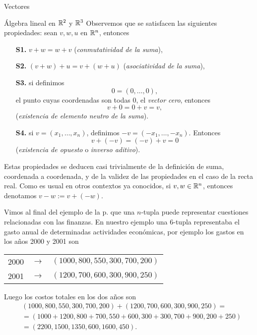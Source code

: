 \begin{chapter}{Vectores}
\begin{section}{\'Algebra lineal en $\mathbb R^2$ y $\mathbb R^3$}
        Observemos que se satisfacen las siguientes propiedades: sean $v,w,u$ en $\mathbb R^n$,  entonces
        \begin{enumerate}
        \item[\textbf{S1.}] $v + w = w + v$ (\textit{conmutatividad de la suma}),
        \item[\textbf{S2.}] $(v+ w)+ u = v + (w+u)$ (\textit{asociatividad de la suma}),
        \item[\textbf{S3.}] si definimos
        \begin{equation*}
        0 = (0,\dots,0),
        \end{equation*}
        el punto cuyas coordenadas son todas $0$, el \textit{vector cero}, entonces 
            \begin{equation*}
        v +0 = 0 +v = v,
        \end{equation*}
         (\textit{existencia de elemento neutro de la suma}).
        \item[\textbf{S4.}]si $v = (x_1,\ldots,x_n)$,  definimos $-v = (-x_1,\ldots, -x_n)$. Entonces 
        \begin{equation*}
        v + (-v) = (-v) + v = 0
        \end{equation*} 
        (\textit{existencia de opuesto} o  \textit{inverso aditivo}).
    \end{enumerate}

    Estas propiedades se deducen casi trivialmente de la definición de suma, coordenada a coordenada, y de la validez de las propiedades en el caso de la recta real. Como es usual en otros contextos ya conocidos, si $v,w \in \mathbb R^n$,  entonces denotamos $v- w := v + (-w)$.
    
    
    
    
   
    \begin{ejemplo*} 
        Vimos al final del ejemplo de la p. \pageref{ej-3espacio-industria} que una $n$-tupla puede representar cuestiones relacionadas con las finanzas. En  nuestro ejemplo una 6-tupla representaba el gasto anual de determinadas actividades económicas, por ejemplo los gastos  en los años 2000 y 2001 son 
        \begin{center}
            \begin{tabular}{lcl}
                2000 \quad&$\rightarrow$\quad &$(1000, 800, 550, 300, 700, 200)$ \\
                2001 \quad&$\rightarrow$\quad &$(1200, 700, 600, 300, 900, 250)$ 
            \end{tabular} 
        \end{center}
        Luego los costos totales en los dos años son 
        \begin{align*}
            &(1000, 800, 550, 300, 700, 200) + (1200, 700, 600, 300, 900, 250) = \\
            &=(1000+1200, 800+700, 550+600, 300+300, 700+900, 200+250) \\
            &= (2200, 1500, 1350, 600, 1600, 450). 
        \end{align*} 
    \end{ejemplo*}
    

\end{section}
\end{chapter}
